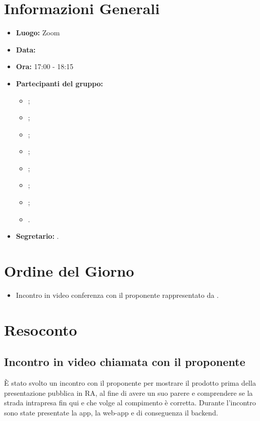 \section{Informazioni Generali}
\begin{itemize}
	\item \textbf{Luogo:} Zoom
	\item \textbf{Data:} \Data
	\item \textbf{Ora:} 17:00 - 18:15
	\item \textbf{Partecipanti del gruppo:}
	\begin{itemize}
		\item \AT{};
		\item \BR{};  
		\item \CE{}; 
		\item \DF{};
		\item \LD{};
		\item \MC{};
		\item \PF{};
		\item \SE{}.
	\end{itemize} 
	\item \textbf{Segretario:} \AT{}.
\end{itemize}

\section{Ordine del Giorno}
\begin{itemize}
	\item Incontro in video conferenza con il proponente \Proponente{} rappresentato da \ZD{}.
\end{itemize}

\section{Resoconto}

\subsection{Incontro in video chiamata con il proponente}
È stato svolto un incontro con il proponente per mostrare il prodotto \NomeProgetto{} prima della presentazione pubblica in RA, al fine di avere un suo parere e comprendere se la strada intrapresa fin qui e che volge al compimento è corretta.
Durante l'incontro sono state presentate la app, la web-app e di conseguenza il backend.

\clearpage